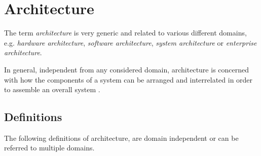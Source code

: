 











\section{Architecture}

\label{ch:architecture}

The term \emph{architecture} is very generic and related to various different domains, e.g. \emph{hardware architecture}, \emph{software architecture}, \emph{system architecture} or \emph{enterprise architecture}. 

In general, independent from any considered domain, architecture is concerned with how the components of a system can be arranged and interrelated in order to assemble an overall system \cite{ISO_42010} \cite{ning}. 



\subsection{Definitions}
The following definitions of architecture, are domain independent or can be referred to multiple domains.

